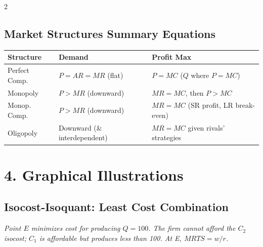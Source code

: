 \documentclass[10pt,a4paper]{article}
\begin{document}
\begin{multicols}{2}
\subsection*{Market Structures Summary Equations}
\begin{center}
\begin{tabular}{@{}p{2cm}p{1.8cm}p{2.2cm}@{}}
\toprule
\textbf{Structure} & \textbf{Demand} & \textbf{Profit Max} \\
\midrule
Perfect Comp. & $P = AR = MR$ (flat) & $P = MC$ ($Q$ where $P=MC$) \\
Monopoly & $P > MR$ (downward) & $MR = MC$, then $P > MC$ \\
Monop. Comp. & $P > MR$ (downward) & $MR = MC$ (SR profit, LR break-even) \\
Oligopoly & Downward (\& interdependent) & $MR = MC$ given rivals' strategies \\
\bottomrule
\end{tabular}
\end{center}

\section*{4. Graphical Illustrations}

\subsection*{Isocost-Isoquant: Least Cost Combination}
\begin{center}
\end{center}
\textit{Point $E$ minimizes cost for producing $Q=100$. The firm cannot afford the $C_2$ isocost; $C_1$ is affordable but produces less than 100. At E, $MRTS = w/r$.}


\end{multicols}
\end{document}
